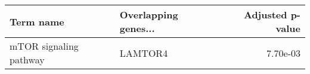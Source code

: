 \begin{tabular}{llr}
\toprule
             Term name & Overlapping genes... &  Adjusted p-value \\
\midrule
mTOR signaling pathway &              LAMTOR4 &          7.70e-03 \\
\bottomrule
\end{tabular}
